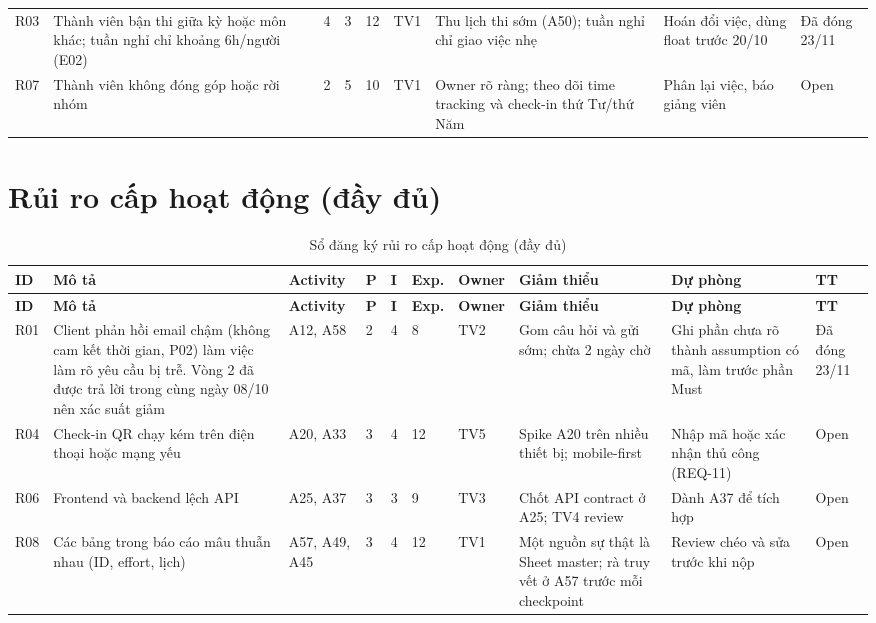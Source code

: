 \begin{landscape}
\begin{longtable}{L{1.16cm}L{3.75cm}L{0.44cm}L{0.44cm}L{1.30cm}L{1.88cm}L{4.34cm}L{3.47cm}L{1.45cm}}
R03 & Thành viên bận thi giữa kỳ hoặc môn khác; tuần nghỉ chỉ khoảng 6h/người (E02) & 4 & 3 & 12 & TV1 & Thu lịch thi sớm (A50); tuần nghỉ chỉ giao việc nhẹ & Hoán đổi việc, dùng float trước 20/10 & Đã đóng 23/11 \\
R07 & Thành viên không đóng góp hoặc rời nhóm & 2 & 5 & 10 & TV1 & Owner rõ ràng; theo dõi time tracking và check-in thứ Tư/thứ Năm & Phân lại việc, báo giảng viên & Open \\
\end{longtable}
\endgroup

\section{Rủi ro cấp hoạt động (đầy đủ)}
\begingroup\tblsetup\footnotesize\renewcommand{\arraystretch}{1.1}\tblzebra
\begin{longtable}{L{0.70cm}L{3.82cm}L{1.61cm}L{0.30cm}L{0.30cm}L{0.90cm}L{1.31cm}L{4.23cm}L{3.32cm}L{1.31cm}}
\caption{Sổ đăng ký rủi ro cấp hoạt động (đầy đủ)}\label{tab:risk-activity}\\
\toprule
{}\textbf{ID} & \textbf{Mô tả} & \textbf{Activity} & \textbf{P} & \textbf{I} & \textbf{Exp.} & \textbf{Owner} & \textbf{Giảm thiểu} & \textbf{Dự phòng} & \textbf{TT} \\
\midrule
\endfirsthead
\toprule
{}\textbf{ID} & \textbf{Mô tả} & \textbf{Activity} & \textbf{P} & \textbf{I} & \textbf{Exp.} & \textbf{Owner} & \textbf{Giảm thiểu} & \textbf{Dự phòng} & \textbf{TT} \\
\midrule
\endhead
\bottomrule
\endlastfoot
R01 & Client phản hồi email chậm (không cam kết thời gian, P02) làm việc làm rõ yêu cầu bị trễ. Vòng 2 đã được trả lời trong cùng ngày 08/10 nên xác suất giảm & A12, A58 & 2 & 4 & 8 & TV2 & Gom câu hỏi và gửi sớm; chừa 2 ngày chờ & Ghi phần chưa rõ thành assumption có mã, làm trước phần Must & Đã đóng 23/11 \\
R04 & Check-in QR chạy kém trên điện thoại hoặc mạng yếu & A20, A33 & 3 & 4 & 12 & TV5 & Spike A20 trên nhiều thiết bị; mobile-first & Nhập mã hoặc xác nhận thủ công (REQ-11) & Open \\
R06 & Frontend và backend lệch API & A25, A37 & 3 & 3 & 9 & TV3 & Chốt API contract ở A25; TV4 review & Dành A37 để tích hợp & Open \\
R08 & Các bảng trong báo cáo mâu thuẫn nhau (ID, effort, lịch) & A57, A49, A45 & 3 & 4 & 12 & TV1 & Một nguồn sự thật là Sheet master; rà truy vết ở A57 trước mỗi checkpoint & Review chéo và sửa trước khi nộp & Open \\

\end{longtable}
\end{landscape}

